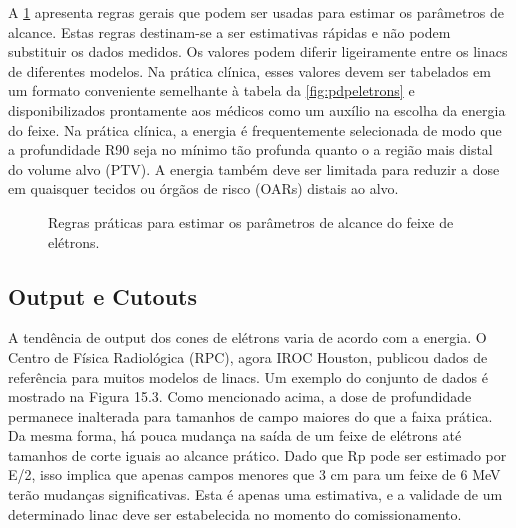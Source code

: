 \documentclass[11pt,a4paper]{article}
\newcounter{exemplo}
\begin{document}
	A \ref{fig:estimarOsRs} apresenta regras gerais que podem ser usadas para estimar os parâmetros de alcance. Estas regras destinam-se a ser estimativas rápidas e não podem substituir os dados medidos. Os valores podem diferir ligeiramente entre os linacs de diferentes modelos. Na prática clínica, esses valores devem ser tabelados em um formato conveniente semelhante à tabela da \ref{fig:pdpeletrons} e disponibilizados prontamente aos médicos como um auxílio na escolha da energia do feixe. Na prática clínica, a energia é frequentemente selecionada de modo que a profundidade R90 seja no mínimo tão profunda quanto o a região mais distal do volume alvo (PTV). A energia também deve ser limitada para reduzir a dose em quaisquer tecidos ou órgãos de risco (OARs) distais ao alvo.

	\begin{figure}[h]
		\centering
		\caption{Regras práticas para estimar os parâmetros de alcance do feixe de elétrons.}
		\label{fig:estimarOsRs}
	\end{figure}

\subsection*{Output e Cutouts}

	A tendência de output dos cones de elétrons varia de acordo com a energia. O Centro de Física Radiológica (RPC), agora IROC Houston, publicou dados de referência para muitos modelos de linacs. Um exemplo do conjunto de dados é mostrado na Figura 15.3. Como mencionado acima, a dose de profundidade permanece inalterada para tamanhos de campo maiores do que a faixa prática. Da mesma forma, há pouca mudança na saída de um feixe de elétrons até tamanhos de corte iguais ao alcance prático. Dado que Rp pode ser estimado por E/2, isso implica que apenas campos menores que 3 cm para um feixe de 6 MeV terão mudanças significativas. Esta é apenas uma estimativa, e a validade de um determinado linac deve ser estabelecida no momento do comissionamento.
\end{document}
